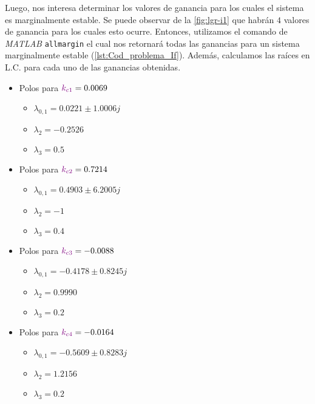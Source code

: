 Luego, nos interesa determinar los valores de ganancia para los cuales el sistema
es marginalmente estable. Se puede observar de la \autoref{fig:lgr-i1} que habrán
$4$ valores de ganancia para los cuales esto ocurre. Entonces, utilizamos el comando
de \textit{MATLAB} \verb|allmargin| el cual nos retornará todas las ganancias
para un sistema marginalmente estable (\autoref{lst:Cod_problema_If}). Además,
calculamos las raíces en L.C. para cada uno de las ganancias obtenidas.

\begin{multicols}{2}
  \begin{itemize}
  \item Polos para \(\mathbin{\color{violet}k_{c1}} = 0.0069\)
    \begin{itemize}
      \item $\lambda_{0,1} =0.0221 \pm 1.0006j$
      \item $\lambda_{2} = -0.2526$
      \item $\lambda_{3} = 0.5$
    \end{itemize}

  \item Polos para \(\mathbin{\color{violet}k_{c2}} = 0.7214\)
    \begin{itemize}
      \item $\lambda_{0,1} = 0.4903 \pm 6.2005j$
      \item $\lambda_{2} = -1$
      \item $\lambda_{3} = 0.4$
    \end{itemize}

  \columnbreak

  \item Polos para \(\mathbin{\color{violet}k_{c3}} = -0.0088\)
    \begin{itemize}
      \item $\lambda_{0,1} = -0.4178 \pm 0.8245j$
      \item $\lambda_{2} = 0.9990$
      \item $\lambda_{3} = 0.2$
    \end{itemize}

  \item Polos para \(\mathbin{\color{violet}k_{c4}} = -0.0164\)
    \begin{itemize}
      \item $\lambda_{0,1} = -0.5609 \pm 0.8283j$
      \item $\lambda_{2} = 1.2156$
      \item $\lambda_{3} = 0.2$
    \end{itemize}
  \end{itemize}
\end{multicols}

